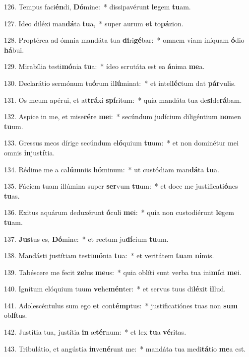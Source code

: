 126. Tempus faci\textbf{én}di, \textbf{Dó}mine:~*  dissipavérunt \textbf{le}gem \textbf{tu}am.\

127. Ideo diléxi man\textbf{dá}ta \textbf{tu}a,~*  super aurum \textbf{et} to\textbf{pá}zion.\

128. Proptérea ad ómnia mandáta tua \textbf{di}ri\textbf{gé}bar:~*  omnem viam iníquam \textbf{ó}dio \textbf{há}bui.\

129. Mirabília testi\textbf{mó}nia \textbf{tu}a:~*  ídeo scrutáta est ea \textbf{á}nima \textbf{me}a.\

130. Declarátio sermónum tu\textbf{ó}rum il\textbf{lú}minat:~*  et intel\textbf{léc}tum dat \textbf{pár}vulis.\

131. Os meum apérui, et at\textbf{trá}xi \textbf{spí}ritum:~*  quia mandáta tua de\textbf{si}de\textbf{rá}bam.\

132. Aspice in me, et mise\textbf{ré}re \textbf{me}i:~*  secúndum judícium diligéntium \textbf{no}men \textbf{tu}um.\

133. Gressus meos dírige secúndum e\textbf{ló}quium \textbf{tu}um:~*  et non dominétur mei omnis \textbf{in}jus\textbf{tí}tia.\

134. Rédime me a ca\textbf{lúm}niis \textbf{hó}minum:~*  ut custódiam man\textbf{dá}ta \textbf{tu}a.\

135. Fáciem tuam illúmina super \textbf{ser}vum \textbf{tu}um:~*  et doce me justificati\textbf{ó}nes \textbf{tu}as.\

136. Exitus aquárum deduxérunt \textbf{ó}culi \textbf{me}i:~*  quia non custodiérunt \textbf{le}gem \textbf{tu}am.\

137. \textbf{Jus}tus es, \textbf{Dó}mine:~*  et rectum ju\textbf{dí}cium \textbf{tu}um.\

138. Mandásti justítiam testi\textbf{mó}nia \textbf{tu}a:~*  et veritátem \textbf{tu}am \textbf{ni}mis.\

139. Tabéscere me fecit \textbf{ze}lus \textbf{me}us:~*  quia oblíti sunt verba tua ini\textbf{mí}ci \textbf{me}i.\

140. Ignítum elóquium tuum \textbf{ve}he\textbf{mén}ter:~*  et servus tuus di\textbf{lé}xit \textbf{il}lud.\

141. Adolescéntulus sum ego \textbf{et} con\textbf{témp}tus:~*  justificatiónes tuas non \textbf{sum} ob\textbf{lí}tus.\

142. Justítia tua, justítia \textbf{in} æ\textbf{tér}num:~*  et lex \textbf{tu}a \textbf{vé}ritas.\

143. Tribulátio, et angústia \textbf{in}ve\textbf{né}runt me:~*  mandáta tua medi\textbf{tá}tio \textbf{me}a est.\

